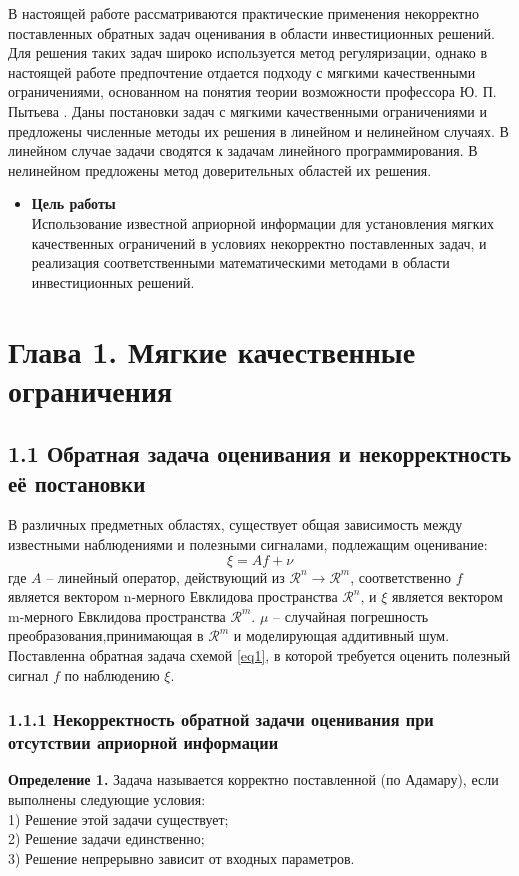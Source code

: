 \documentclass[12pt, a4paper, oneside]{article}
\begin{document}
	В настоящей работе рассматриваются практические применения некорректно поставленных обратных задач оценивания в области инвестиционных решений. Для решения таких задач широко используется метод регуляризации, однако в настоящей работе предпочтение отдается подходу с мягкими качественными ограничениями, основанном на понятия теории возможности профессора Ю. П. Пытьева \cite{1}. Даны постановки задач с мягкими качественными ограничениями и предложены численные методы их решения в линейном и нелинейном случаях. В линейном случае задачи сводятся к задачам линейного программирования. В нелинейном предложены метод доверительных областей их решения. \cite{2}\\
	
	\begin{itemize}
		\item \textbf{Цель работы}\\
		Использование известной априорной информации для установления мягких качественных ограничений в условиях некорректно поставленных задач, и реализация соответственными математическими методами в области инвестиционных решений.
	\end{itemize}
	
\newpage
	\section{Глава 1. Мягкие качественные ограничения}
		\subsection{1.1	 Обратная задача оценивания и некорректность её постановки}
			В различных предметных областях, существует общая зависимость между известными наблюдениями и полезными сигналами, подлежащим оценивание:
			\begin{equation}
				\label{eq1}
				\xi = Af + \nu
			\end{equation}
			где $A$ -- линейный оператор, действующий из $\mathcal{R}^n \to \mathcal{R}^m$, соответственно $f$ является вектором n-мерного Евклидова пространства $\mathcal{R}^n$, и $\xi$ является вектором m-мерного Евклидова пространства $\mathcal{R}^m$. $\mu$ -- случайная погрешность преобразования,принимающая в $\mathcal{R}^m$ и моделирующая аддитивный шум. Поставленна обратная задача схемой \eqref{eq1}, в которой требуется оценить полезный сигнал $f$ по наблюдению $\xi$.

			\subsubsection{1.1.1 Некорректность обратной задачи оценивания при отсутствии априорной информации}
				\textbf{Определение 1.} Задача называется корректно поставленной (по Адамару), если выполнены следующие условия:\\
				1) Решение этой задачи существует;\\ 
				2) Решение задачи единственно;\\
				3) Решение непрерывно зависит от входных параметров.
				
\end{document}
